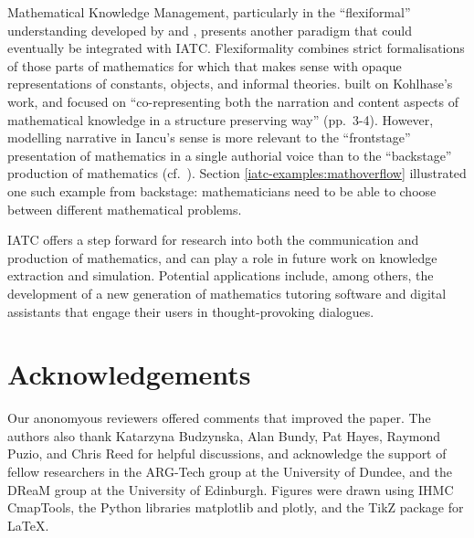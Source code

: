 \documentclass[smallextended,oneside]{svjour3}       %
\newcommand\nothing[1]{#1}
\let\paragraph\nothing
\begin{document}
\paragraph{Mathematical Knowledge Management, particularly in the ``flexiformal'' understanding developed by \citet{kohlhase2012flexiformalist} and \citet{kohlhase2017mathematical}, presents another paradigm that could eventually be integrated with IATC.}
Flexiformality combines strict formalisations of those parts of
mathematics for which that makes sense with opaque representations of
constants, objects, and informal theories.  \citet{iancu-thesis} built
on Kohlhase's work, and focused on ``co-representing both the
narration and content aspects of mathematical knowledge in a structure
preserving way'' (pp.~3-4).  However, modelling narrative in Iancu's
sense is more relevant to the ``frontstage'' presentation of
mathematics in a single authorial voice than to the ``backstage''
production of mathematics (cf.~\citet{hersh1991mathematics}).  Section
\ref{iatc-examples:mathoverflow} illustrated one such example from
backstage: mathematicians need to be able to choose between different
mathematical problems.

\paragraph{IATC offers a step forward for research into both the communication and production of mathematics, and can play a role in future work on knowledge extraction and simulation.}
Potential applications include, among others, the development of a new
generation of mathematics tutoring software and digital assistants
that engage their users in thought-provoking dialogues.

\section{Acknowledgements}
Our anonomyous reviewers offered comments that improved the paper.
The authors also thank Katarzyna Budzynska, Alan Bundy, Pat Hayes, Raymond Puzio, and Chris Reed for helpful discussions, and acknowledge the support of fellow researchers in the ARG-Tech group at the University of Dundee, and the DReaM group at the University of Edinburgh.  Figures were drawn using IHMC CmapTools, the Python libraries matplotlib and plotly, and the TikZ package for \LaTeX.

\end{document}
